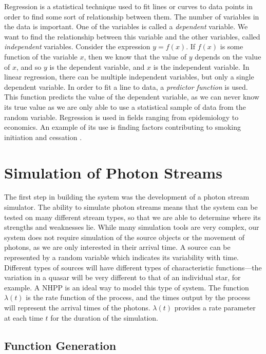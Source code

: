 \documentclass[a4paper,11pt]{article}
\begin{document}
   Regression is a statistical technique used to fit lines or curves to data
   points in order to find some sort of relationship between them. The number of
   variables in the data is important. One of the variables is called a
   \emph{dependent} variable. We want to find the relationship between this
   variable and the other variables, called \emph{independent}
   variables. Consider the expression $y=f(x)$. If $f(x)$ is some function of
   the variable $x$, then we know that the value of $y$ depends on the value of
   $x$, and so $y$ is the dependent variable, and $x$ is the independent
   variable. In linear regression, there can be multiple independent variables,
   but only a single dependent variable. In order to fit a line to data, a
   \emph{predictor function} is used. This function predicts the value of the
   dependent variable, as we can never know its true value as we are only able
   to use a statistical sample of data from the random variable. Regression is
   used in fields ranging from epidemiology to economics. An example of its use
   is finding factors contributing to smoking initiation and cessation
   \cite{van2005determinants}.
\section{Simulation of Photon Streams}
\label{sec-3}

  The first step in building the system was the development of a photon stream
  simulator. The ability to simulate photon streams means that the system can be
  tested on many different stream types, so that we are able to determine where
  its strengths and weaknesses lie. While many simulation tools are very
  complex, our system does not require simulation of the source objects or the
  movement of photons, as we are only interested in their arrival time. A source
  can be represented by a random variable which indicates its variability with
  time. Different types of sources will have different types of characteristic
  functions---the variation in a quasar will be very different to that of an
  individual star, for example. A NHPP is an ideal way to model this type of
  system. The function $\lambda(t)$ is the rate function of the process, and the
  times output by the process will represent the arrival times of the
  photons. $\lambda(t)$ provides a rate parameter at each time $t$ for the
  duration of the simulation.
\subsection{Function Generation}
\label{sec-3-1}
\end{document}
